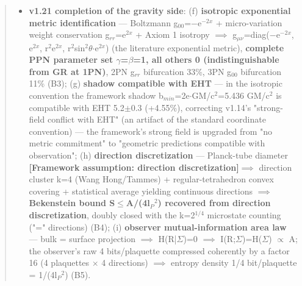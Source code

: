 \documentclass[12pt]{article}
\newcommand{\mtag}[1]{\textbf{[#1]}}
\newcommand{\up}[1]{\ensuremath{^{#1}}}
\newcommand{\down}[1]{\ensuremath{_{#1}}}
\begin{document}
\begin{abstract}
\begin{enumerate}
\begin{itemize}
\item \textbf{v1.21 completion of the gravity side}: (f) \textbf{isotropic exponential metric identification} --- Boltzmann g\down{00}=\ensuremath{-}e\up{-2x} + micro-variation weight conservation g\down{rr}=e\up{2x} + Axiom 1 isotropy \ensuremath{\implies} g\down{\mu{}\nu{}}=diag(\ensuremath{-}e\up{-2x}, e\up{2x}, r\up{2}e\up{2x}, r\up{2}sin\up{2}\ensuremath{\theta}\ensuremath{\cdot}e\up{2x}) (the literature exponential metric), \textbf{complete PPN parameter set \ensuremath{\gamma}=\ensuremath{\beta}=1, all others 0 (indistinguishable from GR at 1PN)}, 2PN g\down{rr} bifurcation 33\%, 3PN g\down{00} bifurcation 11\% (B3); (g) \textbf{shadow compatible with EHT} --- in the isotropic convention the framework shadow b\down{min}=2e\ensuremath{\cdot}GM/c\up{2}=5.436 GM/c\up{2} is compatible with EHT 5.2\ensuremath{\pm}0.3 (+4.55\%), correcting v1.14's "strong-field conflict with EHT" (an artifact of the standard coordinate convention) --- the framework's strong field is upgraded from "no metric commitment" to "geometric predictions compatible with observation"; (h) \textbf{direction discretization} --- Planck-tube diameter \mtag{Framework assumption: direction discretization}\ensuremath{\implies} direction cluster k=4 (Wang Hong/Tammes) + regular-tetrahedron convex covering + statistical average yielding continuous directions \ensuremath{\implies} \textbf{Bekenstein bound S\ensuremath{\leq}A/(4l\down{P}\up{2}) recovered from direction discretization}, doubly closed with the k=2\up{1/4} microstate counting ("=" directions) (B4); (i) \textbf{observer mutual-information area law} --- bulk = surface projection \ensuremath{\implies} H(R|\ensuremath{\Sigma})=0 \ensuremath{\implies} I(R;\ensuremath{\Sigma})=H(\ensuremath{\Sigma}) \ensuremath{\propto} A; the observer's raw 4 bits/plaquette compressed coherently by a factor 16 (4 plaquettes \ensuremath{\times} 4 directions) \ensuremath{\implies} entropy density 1/4 bit/plaquette = 1/(4l\down{P}\up{2}) (B5).
\end{itemize}
\end{enumerate}


\end{abstract}
\end{document}
